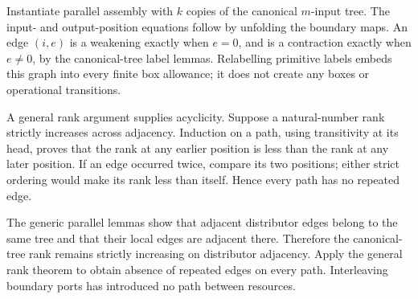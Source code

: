


Instantiate parallel assembly with $k$ copies of the canonical $m$-input
tree. The input- and output-position equations follow by unfolding the
boundary maps. An edge $(i,e)$ is a weakening exactly when $e=0$, and is
a contraction exactly when $e\ne0$, by the canonical-tree label lemmas.
Relabelling primitive labels embeds this graph into every finite box allowance;
it does not create any boxes or operational transitions.







A general rank argument supplies acyclicity. Suppose a natural-number rank
strictly increases across adjacency. Induction on a path, using transitivity
at its head, proves that the rank at any earlier position is less than the
rank at any later position. If an edge occurred twice, compare its two
positions; either strict ordering would make its rank less than itself.
Hence every path has no repeated edge.



The generic parallel lemmas show that adjacent distributor edges belong
to the same tree and that their local edges are adjacent there. Therefore
the canonical-tree rank remains strictly increasing on distributor adjacency.
Apply the general rank theorem to obtain absence of repeated edges on every
path. Interleaving boundary ports has introduced no path between resources.



